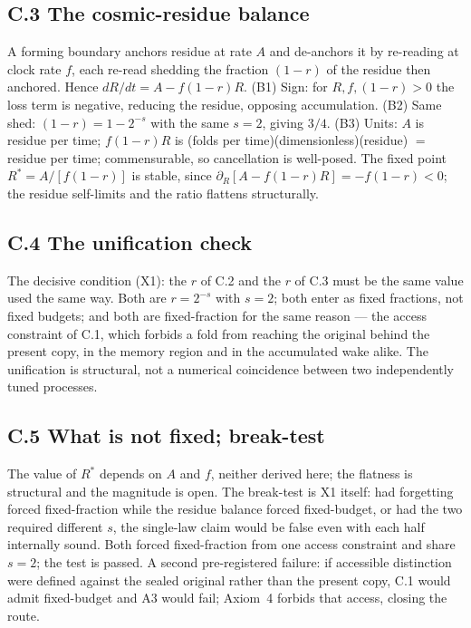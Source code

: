 \documentclass[11pt,oneside]{report}
\theoremstyle{definition}
\theoremstyle{remark}
\begin{document}
\subsection*{C.3 The cosmic-residue balance}

A forming boundary anchors residue at rate \ensuremath{A} and de-anchors
it by re-reading at clock rate \ensuremath{f}, each re-read shedding the
fraction \ensuremath{(1-r)} of the residue then anchored. Hence
\ensuremath{dR/dt = A - f(1-r)R}. (B1) Sign: for
\ensuremath{R, f, (1-r) > 0} the loss term is negative, reducing the
residue, opposing accumulation. (B2) Same shed: \ensuremath{(1-r) = 1 -
2^{-s}} with the same \ensuremath{s = 2}, giving \ensuremath{3/4}. (B3)
Units: \ensuremath{A} is residue per time; \ensuremath{f(1-r)R} is (folds
per time)(dimensionless)(residue) \ensuremath{=} residue per time;
commensurable, so cancellation is well-posed. The fixed point
\ensuremath{R^{*} = A/[f(1-r)]} is stable, since
\ensuremath{\partial_{R}[A - f(1-r)R] = -f(1-r) < 0}; the residue
self-limits and the ratio flattens structurally.

\subsection*{C.4 The unification check}

The decisive condition (X1): the \ensuremath{r} of C.2 and the
\ensuremath{r} of C.3 must be the same value used the same way. Both are
\ensuremath{r = 2^{-s}} with \ensuremath{s = 2}; both enter as fixed
fractions, not fixed budgets; and both are fixed-fraction for the same
reason --- the access constraint of C.1, which forbids a fold from
reaching the original behind the present copy, in the memory region and in
the accumulated wake alike. The unification is structural, not a numerical
coincidence between two independently tuned processes.

\subsection*{C.5 What is not fixed; break-test}

The value of \ensuremath{R^{*}} depends on \ensuremath{A} and
\ensuremath{f}, neither derived here; the flatness is structural and the
magnitude is open. The break-test is X1 itself: had forgetting forced
fixed-fraction while the residue balance forced fixed-budget, or had the
two required different \ensuremath{s}, the single-law claim would be false
even with each half internally sound. Both forced fixed-fraction from one
access constraint and share \ensuremath{s = 2}; the test is passed. A
second pre-registered failure: if accessible distinction were defined
against the sealed original rather than the present copy, C.1 would admit
fixed-budget and A3 would fail; Axiom~4 forbids that access, closing the
route.
\end{document}
